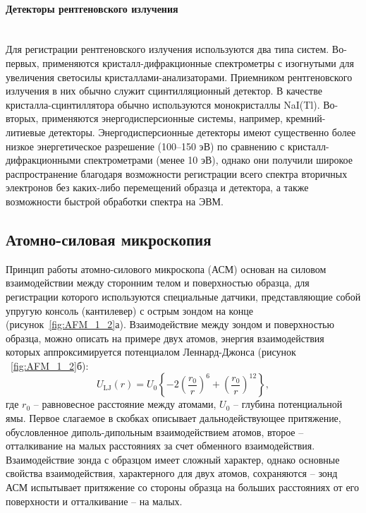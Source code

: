 \paragraph{Детекторы рентгеновского излучения} \mbox{} \\
\indent Для регистрации рентгеновского излучения используются два типа систем. Во-первых, применяются кристалл-дифракционные спектрометры с изогнутыми для увеличения светосилы кристаллами-анализаторами.
Приемником рентгеновского излучения в них обычно служит сцинтилляционный детектор.
В качестве кристалла-сцинтиллятора обычно используются монокристаллы NaI(Tl).
Во-вторых, применяются энергодисперсионные системы, например, кремний-литиевые детекторы.
Энергодисперсионные детекторы имеют существенно более низкое энергетическое разрешение (100--150 эВ) по сравнению с кристалл-дифракционными спектрометрами (менее 10 эВ), однако они получили широкое распространение благодаря возможности регистрации всего спектра вторичных электронов без каких-либо перемещений образца и детектора, а также возможности быстрой обработки спектра на ЭВМ.


\subsection*{Атомно-силовая микроскопия}

Принцип работы атомно-силового микроскопа (АСМ) основан на силовом взаимодействии между сторонним телом и поверхностью образца, для регистрации которого используются специальные датчики, представляющие собой упругую консоль (кантилевер) с острым зондом на конце (рисунок~\ref{fig:AFM_1_2}а).
Взаимодействие между зондом и поверхностью образца, можно описать на примере двух атомов, энергия взаимодействия которых аппроксимируется потенциалом Леннард-Джонса (рисунок ~\ref{fig:AFM_1_2}б):
\begin{equation}
	U_\mathrm{LJ}(r) = U_0\left\{ -2\left(\frac{r_0}{r}\right)^6 + \left(\frac{r_0}{r}\right)^{12}\right\},
\end{equation}
где $r_0$ -- равновесное расстояние между атомами, $U_0$ -- глубина потенциальной ямы.
Первое слагаемое в скобках описывает дальнодействующее притяжение, обусловленное диполь-дипольным взаимодействием атомов, второе -- отталкивание на малых расстояниях за счет обменного взаимодействия.
Взаимодействие зонда с образцом имеет сложный характер, однако основные свойства взаимодействия, характерного для двух атомов, сохраняются -- зонд АСМ испытывает притяжение со стороны образца на больших расстояниях от его поверхности и отталкивание -- на малых.


